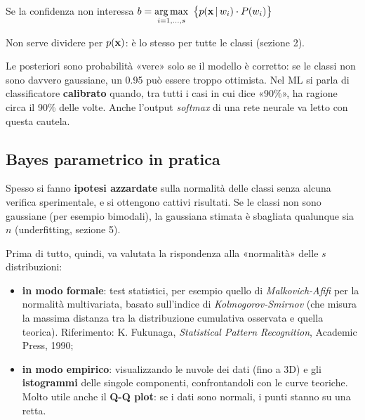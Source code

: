 \begin{formulat}{Se la confidenza non interessa}
$\displaystyle b=\argmax_{i=1,\dots,s}\ \big\{p(\x\,|\,w_i)\cdot P(w_i)\big\}$
\end{formulat}
Non serve dividere per $p(\mathbf{x})$: è lo stesso per tutte le classi (sezione 2).

\begin{mlbox}[Calibrazione]
Le posteriori sono probabilità «vere» solo se il modello è corretto: se le classi non sono davvero gaussiane, un 0.95 può essere troppo ottimista. Nel ML si parla di classificatore \textbf{calibrato} quando, tra tutti i casi in cui dice «90\%», ha ragione circa il 90\% delle volte. Anche l'output \emph{softmax} di una rete neurale va letto con questa cautela.
\end{mlbox}

\subsection{Bayes parametrico in pratica}
\begin{attenzione}
Spesso si fanno \textbf{ipotesi azzardate} sulla normalità delle classi senza alcuna verifica sperimentale, e si ottengono cattivi risultati. Se le classi non sono gaussiane (per esempio bimodali), la gaussiana stimata è sbagliata qualunque sia $n$ (underfitting, sezione 5).
\end{attenzione}
Prima di tutto, quindi, va valutata la rispondenza alla «normalità» delle $s$ distribuzioni:
\begin{itemize}
  \item \textbf{in modo formale}: test statistici, per esempio quello di \emph{Malkovich-Afifi} per la normalità multivariata, basato sull'indice di \emph{Kolmogorov-Smirnov} (che misura la massima distanza tra la distribuzione cumulativa osservata e quella teorica). Riferimento: K. Fukunaga, \emph{Statistical Pattern Recognition}, Academic Press, 1990;
  \item \textbf{in modo empirico}: visualizzando le nuvole dei dati (fino a 3D) e gli \textbf{istogrammi} delle singole componenti, confrontandoli con le curve teoriche. Molto utile anche il \textbf{Q-Q plot}: se i dati sono normali, i punti stanno su una retta.
\end{itemize}

